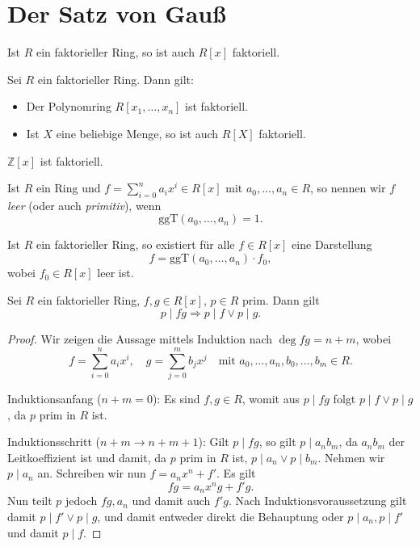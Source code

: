 
\section{Der Satz von Gauß}

\begin{theorem}
    Ist $R$ ein faktorieller Ring, so ist auch $R[x]$ faktoriell.
\end{theorem}

\begin{corollary}
    Sei $R$ ein faktorieller Ring. Dann gilt:
    \begin{itemize}
        \item Der Polynomring $R[x_1, \hdots, x_n]$ ist faktoriell.
        \item Ist $X$ eine beliebige Menge, so ist auch $R[X]$ faktoriell.
    \end{itemize}
\end{corollary}

\begin{corollary}
    $\mathbb{Z}[x]$ ist faktoriell.
\end{corollary}

\begin{definition}
    Ist $R$ ein Ring und $f = \sum_{i=0}^n a_i x^i \in R[x]$ mit $a_0,\ldots,a_n\in R$, so nennen wir $f$ \emph{leer} (oder auch \emph{primitiv}), wenn
    $$ \mathrm{ggT}( a_0, \hdots, a_n ) = 1. $$
\end{definition}

\begin{remark}
    Ist $R$ ein faktorieller Ring, so existiert für alle $f \in R[x]$ eine Darstellung
    $$ f = \mathrm{ggT}(a_0, \hdots, a_n) \cdot f_0, $$
    wobei $f_0 \in R[x]$ leer ist.
\end{remark}

\begin{lemma}
    Sei $R$ ein faktorieller Ring, $f, g \in R[x]$, $p \in R$ prim. Dann gilt
    $$ p \mid f g \Rightarrow p \mid f \lor p \mid g. $$
\end{lemma}

\begin{proof}
    Wir zeigen die Aussage mittels Induktion nach $\deg fg = n+m$, wobei
    $$ f = \sum_{i=0}^n a_i x^i,\quad g = \sum_{j=0}^m b_j x^j \quad \text{mit } a_0,\ldots,a_n,b_0,\ldots,b_m\in R. $$

    Induktionsanfang ($n+m=0$): Es sind $f, g \in R$, womit aus $p \mid fg$ folgt $p \mid f \lor p \mid g$, da $p$ prim in $R$ ist.

    Induktionsschritt ($n+m \to n+m+1$): Gilt $p \mid fg$, so gilt $p \mid a_n b_m$, da $a_n b_m$ der Leitkoeffizient ist und damit, da $p$ prim in $R$ ist, $p \mid a_n \lor p \mid b_m$. Nehmen wir \obda $p \mid a_n$ an. Schreiben wir nun $f = a_n x^n + f'$. Es gilt
    $$ fg = a_n x^n g + f' g. $$
    Nun teilt $p$ jedoch $fg, a_n$ und damit auch $f' g$. Nach Induktionsvoraussetzung gilt damit $p \mid f' \lor p \mid g$, und damit entweder direkt die Behauptung oder $p \mid a_n, p \mid f'$ und damit $p \mid f$.
\end{proof}

